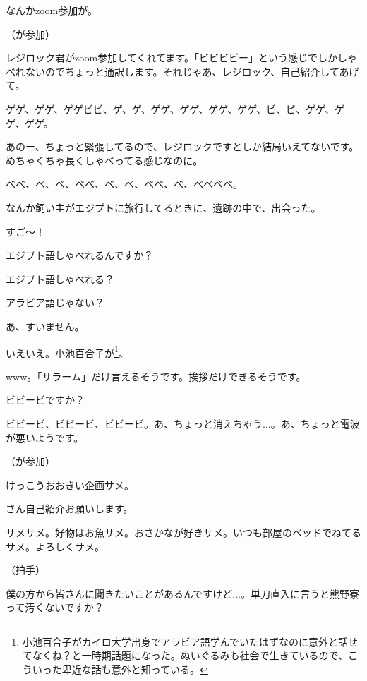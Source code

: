 \documentclass[9pt,4aj]{jsarticle}
\begin{document}
\begin{multicols}{2}
なんかzoom参加が。

（が参加）

レジロック君がzoom参加してくれてます。「ビビビビー」という感じでしかしゃべれないのでちょっと通訳します。それじゃあ、レジロック、自己紹介してあげて。

ゲゲ、ゲゲ、ゲゲビビ、ゲ、ゲ、ゲゲ、ゲゲ、ゲゲ、ゲゲ、ビ、ビ、ゲゲ、ゲゲ、ゲゲ。

あのー、ちょっと緊張してるので、レジロックですとしか結局いえてないです。めちゃくちゃ長くしゃべってる感じなのに。

ベべ、ベ、ベ、ベベ、ベ、ベ、ベベ、ベ、ベベベベ。

なんか飼い主がエジプトに旅行してるときに、遺跡の中で、出会った。

すご～！

エジプト語しゃべれるんですか？

エジプト語しゃべれる？

アラビア語じゃない？

あ、すいません。

いえいえ。小池百合子が\footnote{小池百合子がカイロ大学出身でアラビア語学んでいたはずなのに意外と話せてなくね？と一時期話題になった。ぬいぐるみも社会で生きているので、こういった卑近な話も意外と知っている。}。

www。「サラーム」だけ言えるそうです。挨拶だけできるそうです。

ビビービですか？

ビビービ、ビビービ、ビビービ。あ、ちょっと消えちゃう...。あ、ちょっと電波が悪いようです。

（が参加）

けっこうおおきい企画サメ。

さん自己紹介お願いします。

サメサメ。好物はお魚サメ。おさかなが好きサメ。いつも部屋のベッドでねてるサメ。よろしくサメ。

（拍手）

僕の方から皆さんに聞きたいことがあるんですけど...。単刀直入に言うと熊野寮って汚くないですか？


\end{multicols}
\end{document}
